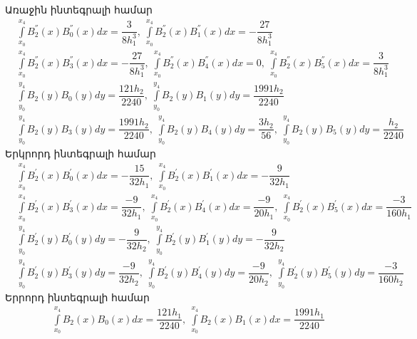 \documentclass[fleqn, bachelor,subf,12pt,notitlepage]{article}
\begin{document}
\begin{enumerate}
Առաջին ինտեգրալի համար
\begin{equation}
\begin{aligned}
&\int \limits_{x_{0}}^{x_{4}}B_{2}^{''}(x)B_{0}^{''}(x)dx = \dfrac{3}{8h_{1}^3}, \; \int \limits_{x_{0}}^{x_{4}}B_{2}^{''}(x)B_{1}^{''}(x)dx = -\dfrac{27}{8h_{1}^3} \\
&\int \limits_{x_{0}}^{x_{4}}B_{2}^{''}(x)B_{3}^{''}(x)dx =-\dfrac{27}{8h_{1}^3}, \; \int \limits_{x_{0}}^{x_{4}}B_{2}^{''}(x)B_{4}^{''}(x)dx = 0, \; \int \limits_{x_{0}}^{x_{4}}B_{2}^{''}(x)B_{5}^{''}(x)dx =  \dfrac{3}{8h_{1}^3} \\
&\int \limits_{y_{0}}^{y_{4}}B_{2}(y)B_{0}(y)dy=\dfrac{121h_{2}}{2240}, \; \int \limits_{y_{0}}^{y_{4}}B_{2}(y)B_{1}(y)dy=\dfrac{1991h_{2}}{2240} \\
&\int \limits_{y_{0}}^{y_{4}}B_{2}(y)B_{3}(y)dy=\dfrac{1991h_{2}}{2240}, \; \int \limits_{y_{0}}^{y_{4}}B_{2}(y)B_{4}(y)dy=\dfrac{3h_{2}}{56}, \; \int \limits_{y_{0}}^{y_{4}}B_{2}(y)B_{5}(y)dy=\dfrac{h_{2}}{2240}
\end{aligned}
\end{equation}
Երկրորդ ինտեգրալի համար
\begin{equation}
\begin{aligned}
&\int \limits_{x_{0}}^{x_{4}}B_{2}^{'}(x)B_{0}^{'}(x)dx=-\dfrac{15}{32h_{1}}, \; \int \limits_{x_{0}}^{x_{4}}B_{2}^{'}(x)B_{1}^{'}(x)dx=-\dfrac{9}{32h_{1}} \\
&\int \limits_{x_{0}}^{x_{4}}B_{2}^{'}(x)B_{3}^{'}(x)dx=\dfrac{-9}{32h_{1}}, \; \int \limits_{x_{0}}^{x_{4}}B_{2}^{'}(x)B_{4}^{'}(x)dx=\dfrac{-9}{20h_{1}}, \; \int \limits_{x_{0}}^{x_{4}}B_{2}^{'}(x)B_{5}^{'}(x)dx=\dfrac{-3}{160h_{1}} \\
&\int \limits_{y_{0}}^{y_{4}}B_{2}^{'}(y)B_{0}^{'}(y)dy=-\dfrac{9}{32h_{2}}, \; \int \limits_{y_{0}}^{y_{4}}B_{2}^{'}(y)B_{1}^{'}(y)dy=-\dfrac{9}{32h_{2}} \\
&\int \limits_{y_{0}}^{y_{4}}B_{2}^{'}(y)B_{3}^{'}(y)dy=\dfrac{-9}{32h_{2}}, \; \int \limits_{y_{0}}^{y_{4}}B_{2}^{'}(y)B_{4}^{'}(y)dy=\dfrac{-9}{20h_{2}}, \; \int \limits_{y_{0}}^{y_{4}}B_{2}^{'}(y)B_{5}^{'}(y)dy=\dfrac{-3}{160h_{2}}
\end{aligned}
\end{equation}
Երրորդ ինտեգրալի համար
\begin{equation}
\begin{aligned}
&\int \limits_{x_{0}}^{x_{4}}B_{2}(x)B_{0}(x)dx=\dfrac{121h_{1}}{2240}, \; \int \limits_{x_{0}}^{x_{4}}B_{2}(x)B_{1}(x)dx=\dfrac{1991h_{1}}{2240} \\

\end{aligned}
\end{equation}
\end{enumerate}
\end{document}
